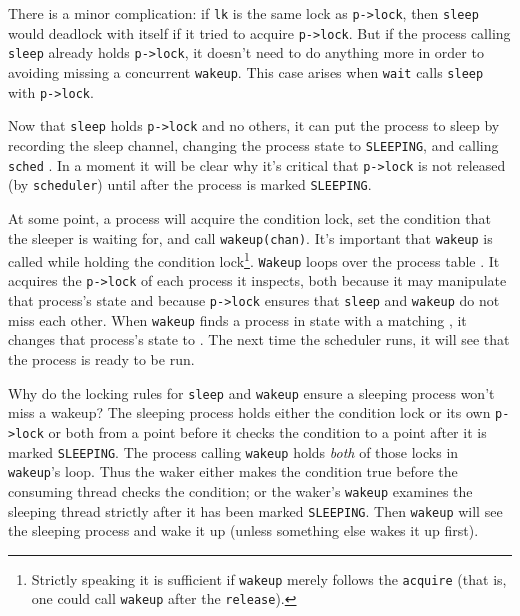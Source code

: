 There is a minor complication: if 
\lstinline{lk}
is the same lock as
\lstinline{p->lock},
then
\lstinline{sleep}
would deadlock with itself if it tried to acquire 
\lstinline{p->lock}.
But if the process calling
\lstinline{sleep}
already holds \lstinline{p->lock}, it
doesn't need to do anything more in order
to avoiding missing a concurrent \lstinline{wakeup}.
This case arises when
\lstinline{wait}
calls
\lstinline{sleep}
with 
\lstinline{p->lock}.

Now that
\lstinline{sleep}
holds
\lstinline{p->lock}
and no others,
it can put the process to sleep by recording
the sleep channel,
changing the process state to \texttt{SLEEPING},
and calling
\lstinline{sched}
.
In a moment it will be clear why it's critical that
\lstinline{p->lock} is not released (by \lstinline{scheduler}) until after
the process is marked \texttt{SLEEPING}.

At some point, a process will acquire the condition lock,
set the condition that the sleeper is waiting for,
and call \lstinline{wakeup(chan)}.
It's important that \lstinline{wakeup} is called
while holding the condition lock\footnote{%
%
Strictly speaking it is sufficient if
\lstinline{wakeup}
merely follows the
\lstinline{acquire}
(that is, one could call
\lstinline{wakeup}
after the
\lstinline{release}).%
%
}.
\lstinline{Wakeup}
loops over the process table
.
It acquires the
\lstinline{p->lock}
of each process it inspects,
both because it may manipulate that process's state
and because
\lstinline{p->lock}
ensures that
\lstinline{sleep}
and
\lstinline{wakeup}
do not miss each other.
When \lstinline{wakeup} finds a process in state
with a matching
,
it changes that process's state to
.
The next time the scheduler runs, it will
see that the process is ready to be run.

Why do the locking rules for 
\lstinline{sleep}
and
\lstinline{wakeup}
ensure a sleeping process won't miss a wakeup?
The sleeping process holds either
the condition lock or its own
\lstinline{p->lock} 
or both from a point before it checks the condition
to a point after it is marked \texttt{SLEEPING}.
The process calling \texttt{wakeup} holds \textit{both}
of those locks in \texttt{wakeup}'s loop.
Thus the waker either makes the condition true before
the consuming thread checks the condition;
or the waker's \lstinline{wakeup} examines the sleeping
thread strictly after it has been marked \texttt{SLEEPING}.
Then 
\lstinline{wakeup}
will see the sleeping process and wake it up
(unless something else wakes it up first).


